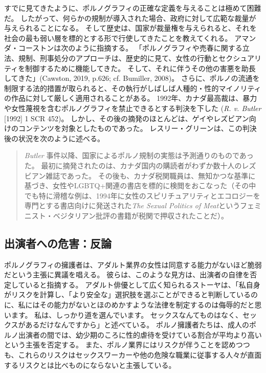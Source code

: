 \documentclass[paper=a4,book,openany]{jlreq} \usepackage{mystyle}
\begin{document}
すでに見てきたように、ポルノグラフィの正確な定義を与えることは極めて困難だ。
したがって、何らかの規制が導入された場合、政府に対して広範な裁量が与えられることになる。
そして歴史は、国家が裁量権を与えられると、それを社会の最も弱い層を標的とする形で行使してきたことを教えてくれる。
アマンダ・コーストンは次のように指摘する。
「ポルノグラフィや売春に関する立法、規制、刑事処分のアプローチは、歴史的に見て、女性の行動とセクシュアリティを制御するために機能してきた。
そして、それに伴うその他の害悪を助長してきた」(Cawston, 2019, p.626; cf. Bumiller, 2008)。
\nocite{cawston19:_femin_case_pornog}\nocite{bumiller08:_in_abusiv_state}
さらに、ポルノの流通を制限する法的措置が取られると、その執行がしばしば人種的・性的マイノリティの作品に対して厳しく適用されることがある。
1992年、カナダ最高裁は、暴力や女性蔑視を含むポルノグラフィを禁止できるとする判決を下した
(\emph{R. v. Butler} [1992] 1 SCR 452)。
しかし、その後の摘発のほとんどは、ゲイやレズビアン向けのコンテンツを対象としたものであった\citep{mackinnon94:_statem_cathar}。
レスリー・グリーンは、この判決後の状況を次のように述べる。

\begin{quote}
\emph{Butler} 事件以降、国家によるポルノ規制の実態は予測通りのものであった。
最初に摘発されたのは、カナダ国内の購読者がわずか数十人のレズビアン雑誌であった。
その後も、カナダ税関職員は、無知かつな基準に基づき、女性やLGBTQ+関連の書店を標的に検閲をおこなった（その中でも特に滑稽な例は、1994年に女性のスピリチュアリティとエコロジーを専門とする書店向けに発送された\emph{The Sexual Politics of Meat}というフェミニスト・ベジタリアン批評の書籍が税関で押収されたことだ）。
\citep{green00:pornographies}
\end{quote}

\subsection{出演者への危害：反論}

ポルノグラフィの擁護者は、アダルト業界の女性は同意する能力がないほど脆弱だという主張に異議を唱える。
彼らは、このような見方は、出演者の自律を否定していると指摘する。
アダルト俳優として広く知られるストーヤは、「私自身がリスクを計算し、「より安全な」選択肢を選ぶことができると判断しているのに、私にはその能力がないとほのめかすような法律を制定するのは侮辱的だと思います。
私は、しっかり道を選んでいます。
セックスなんてものはなく、セックスがあるだけなんですから」と述べている\citep{kernes12:_no_gover_waste_commit_holds_press_confer}。
ポルノ擁護者たちは、成人のポルノ出演者の間では、幼少期のころに性的虐待を受けている割合が平均より高いという主張を否定する\citep[p.621]{griffith13:_pornog_actres}。
また、ポルノ業界にはリスクが伴うことを認めつつも、これらのリスクはセックスワーカーや他の危険な職業に従事する人々が直面するリスクとは比べものにならないと主張している。
\end{document}
